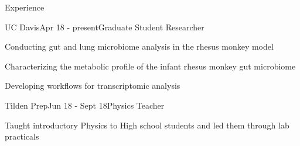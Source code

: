 \documentclass{resume} %
\begin{document}
\begin{rSection}{Experience}
\begin{rSubsection}{UC Davis}{Apr 18 - present}{Graduate Student Researcher}{}

\item Conducting gut and lung microbiome analysis in the rhesus monkey model
\item Characterizing the metabolic profile of the infant rhesus monkey gut microbiome
\item Developing workflows for transcriptomic analysis

\end{rSubsection}


\begin{rSubsection}{Tilden Prep}{Jun 18 - Sept 18}{Physics Teacher}{}

\item Taught introductory Physics to High school students and led them through lab practicals

\end{rSubsection}
\end{rSection}


%
%
\end{document}
